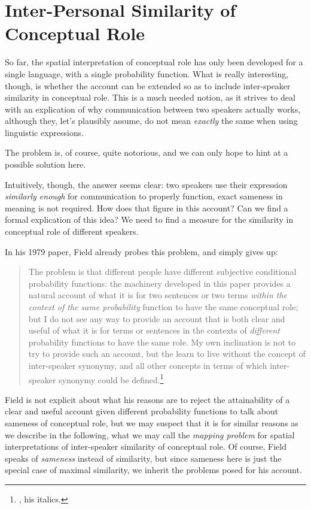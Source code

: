 \documentclass[11pt, a4paper]{scrartcl}
\renewcommand{\i}[1]{\emph{#1}}
\begin{document}
\section{Inter-Personal Similarity of Conceptual Role}

So far, the spatial interpretation of conceptual role has only been developed for a single language, with a single probability function. What is really interesting, though, is whether the account can be extended so as to include inter-speaker similarity in conceptual role. This is a much needed notion, as it strives to deal with an explication of why communication between two speakers actually works, although they, let's plausibly assume, do not mean \i{exactly} the same when using linguistic expressions. 

The problem is, of course, quite notorious, and we can only hope to hint at a possible solution here.

Intuitively, though, the answer seems clear: two speakers use their expression \i{similarly enough} for communication to properly function, exact sameness in meaning is not required. How does that figure in this account? Can we find a formal explication of this idea? We need to find a measure for the similarity in conceptual role of different speakers. 

In his 1979 paper, Field already probes this problem, and simply gives up:
\begin{quote}\singlespacing{}
  The problem is that different people have different subjective
 conditional probability functions: the machinery developed in this
 paper provides a natural account of what it is for two sentences or
 two terms \i{within the context of the same probability} function to have
 the same conceptual role; but I do not see any way to provide an
 account that is both clear and useful of what it is for terms or sentences in the contexts of \i{different} probability functions to have the
 same role. My own inclination is not to try to provide such an
 account, but the learn to live without the concept of inter-speaker
 synonymy, and all other concepts in terms of which inter-speaker
 synonymy could be defined.\footnote{\textcite[398]{Field1977}, his italics.} 
 \end{quote}

 Field is not explicit about what his reasons are to reject the attainability of a clear and useful account given different probability functions to talk about sameness of conceptual role, but we may suspect that it is for similar reasons as we describe in the following, what we may call the \i{mapping problem} for spatial interpretations of inter-speaker similarity of conceptual role. Of course, Field speaks of \i{sameness} instead of similarity, but since sameness here is just the special case of maximal similarity, we inherit the problems posed for his account.  
\end{document}
